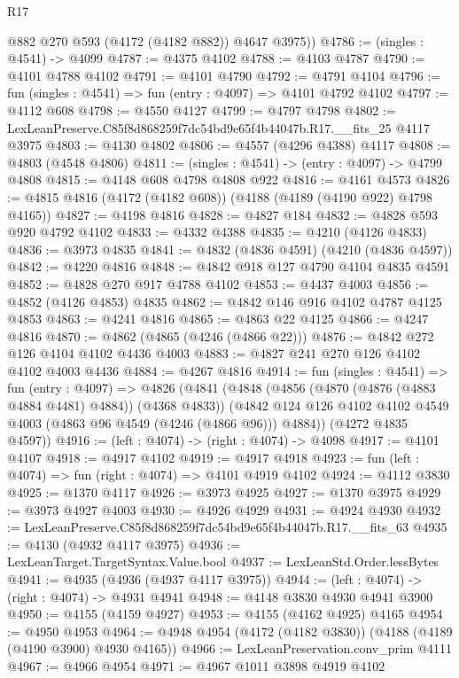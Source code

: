 \begin{lexlean}{R17}
\begin{coremodule}
        @882
        @270
        @593
        (@4172 (@4182 @882))
        @4647
        @3975))
@4786 := (singles : @4541) -> @4099
@4787 := @4375 @4102
@4788 := @4103 @4787
@4790 := @4101 @4788 @4102
@4791 := @4101 @4790
@4792 := @4791 @4104
@4796 := fun (singles : @4541) => fun (entry : @4097) => @4101 @4792 @4102
@4797 := @4112 @608
@4798 := @4550 @4127
@4799 := @4797 @4798
@4802 := LexLeanPreserve.C85f8d868259f7dc54bd9e65f4b44047b.R17.__fits_25 @4117 @3975
@4803 := @4130 @4802
@4806 := @4557 (@4296 @4388) @4117
@4808 := @4803 (@4548 @4806)
@4811 := (singles : @4541) -> (entry : @4097) -> @4799 @4808
@4815 := @4148 @608 @4798 @4808 @922
@4816 := @4161 @4573
@4826 := @4815 @4816 (@4172 (@4182 @608)) (@4188 (@4189 (@4190 @922) @4798 @4165))
@4827 := @4198 @4816
@4828 := @4827 @184
@4832 := @4828 @593 @920 @4792 @4102
@4833 := @4332 @4388
@4835 := @4210 (@4126 @4833)
@4836 := @3973 @4835
@4841 := @4832 (@4836 @4591) (@4210 (@4836 @4597))
@4842 := @4220 @4816
@4848 := @4842 @918 @127 @4790 @4104 @4835 @4591
@4852 := @4828 @270 @917 @4788 @4102
@4853 := @4437 @4003
@4856 := @4852 (@4126 @4853) @4835
@4862 := @4842 @146 @916 @4102 @4787 @4125 @4853
@4863 := @4241 @4816
@4865 := @4863 @22 @4125
@4866 := @4247 @4816
@4870 := @4862 (@4865 (@4246 (@4866 @22)))
@4876 := @4842 @272 @126 @4104 @4102 @4436 @4003
@4883 := @4827 @241 @270 @126 @4102 @4102 @4003 @4436
@4884 := @4267 @4816
@4914 := fun (singles : @4541) =>
  fun (entry : @4097) =>
  @4826
    (@4841
      (@4848
        (@4856 (@4870 (@4876 (@4883 @4884 @4481) @4884)) (@4368 @4833))
        (@4842 @124 @126 @4102 @4102 @4549 @4003 (@4863 @96 @4549 (@4246 (@4866 @96))) @4884))
      (@4272 @4835 @4597))
@4916 := (left : @4074) -> (right : @4074) -> @4098
@4917 := @4101 @4107
@4918 := @4917 @4102
@4919 := @4917 @4918
@4923 := fun (left : @4074) => fun (right : @4074) => @4101 @4919 @4102
@4924 := @4112 @3830
@4925 := @1370 @4117
@4926 := @3973 @4925
@4927 := @1370 @3975
@4929 := @3973 @4927 @4003
@4930 := @4926 @4929
@4931 := @4924 @4930
@4932 := LexLeanPreserve.C85f8d868259f7dc54bd9e65f4b44047b.R17.__fits_63
@4935 := @4130 (@4932 @4117 @3975)
@4936 := LexLeanTarget.TargetSyntax.Value.bool
@4937 := LexLeanStd.Order.lessBytes
@4941 := @4935 (@4936 (@4937 @4117 @3975))
@4944 := (left : @4074) -> (right : @4074) -> @4931 @4941
@4948 := @4148 @3830 @4930 @4941 @3900
@4950 := @4155 (@4159 @4927)
@4953 := @4155 (@4162 @4925) @4165
@4954 := @4950 @4953
@4964 := @4948 @4954 (@4172 (@4182 @3830)) (@4188 (@4189 (@4190 @3900) @4930 @4165))
@4966 := LexLeanPreservation.conv_prim @4111
@4967 := @4966 @4954
@4971 := @4967 @1011 @3898 @4919 @4102

\end{coremodule}
\end{lexlean}
